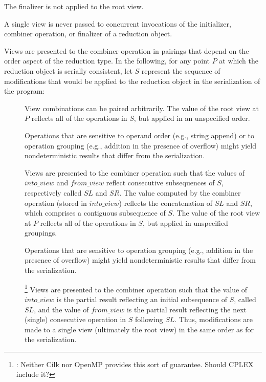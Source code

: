 The finalizer is not applied to the root view.

\begin{note}
A single view is never passed to concurrent invocations
of the initializer, combiner operation, or finalizer
of a reduction object.
\end{note}

\pnum
Views are presented to the combiner operation in pairings
that depend on the order aspect of the reduction type.
In the following,
for any point
$P$
at which the reduction object is serially consistent,
let
$S$
represent the sequence of modifications
that would be applied to the reduction object
in the serialization of the program:

\begin{description}
\item[]

View combinations can be paired arbitrarily.
The value of the root view at
$P$
reflects all of the operations in
$S$,
but applied in an unspecified order.

\begin{note}
Operations that are sensitive to operand order
(e.g., string append)
or to operation grouping
(e.g., addition in the presence of overflow)
might yield nondeterministic results that differ from the serialization.
\end{note}

\item[]

Views are presented to the combiner operation
such that the values of
$into\_view$
and
$from\_view$
reflect consecutive subsequences of
$S$,
respectively called
$SL$ and $SR$.
The value computed by the combiner operation
(stored in
$into\_view$)
reflects the concatenation of
$SL$ and $SR$,
which comprises a contiguous subsequence of
$S$.
The value of the root view at
$P$
reflects all of the operations in
$S$,
but applied in unspecified groupings.

\begin{note}
Operations that are sensitive to operation grouping
(e.g., addition in the presence of overflow)
might yield nondeterministic results that differ from the serialization. 
\end{note}

\item[]
\footnote{:
Neither Cilk nor OpenMP provides this sort of guarantee.
Should CPLEX include it?
}
Views are presented to the combiner operation
such that the value of
$into\_view$
is the partial result reflecting an initial subsequence of
$S$,
called
$SL$,
and the value of
$from\_view$
is the partial result reflecting the next
(single) consecutive operation in
$S$
following
$SL$.
Thus, modifications are made to a single view
(ultimately the root view)
in the same order as for the serialization.


\end{description}
